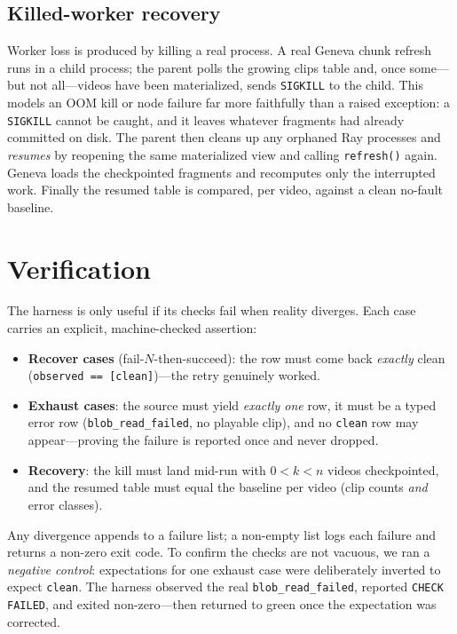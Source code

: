 \documentclass[11pt]{article}
\newcommand{\ct}[1]{\texttt{\small #1}}
\begin{document}
\subsection{Killed-worker recovery}
\label{sec:recovery}

Worker loss is produced by killing a real process. A real Geneva chunk refresh
runs in a child process; the parent polls the growing clips table and, once
some---but not all---videos have been materialized, sends \ct{SIGKILL} to the
child. This models an OOM kill or node failure far more faithfully than a raised
exception: a \ct{SIGKILL} cannot be caught, and it leaves whatever fragments had
already committed on disk. The parent then cleans up any orphaned Ray processes
and \emph{resumes} by reopening the same materialized view and calling
\ct{refresh()} again. Geneva loads the checkpointed fragments and recomputes only
the interrupted work. Finally the resumed table is compared, per video, against a
clean no-fault baseline.

\section{Verification}

The harness is only useful if its checks fail when reality diverges. Each case
carries an explicit, machine-checked assertion:

\begin{itemize}[itemsep=1pt,topsep=2pt]
  \item \textbf{Recover cases} (fail-$N$-then-succeed): the row must come back
  \emph{exactly} clean (\ct{observed == [clean]})---the retry genuinely worked.
  \item \textbf{Exhaust cases}: the source must yield \emph{exactly one} row, it
  must be a typed error row (\ct{blob\_read\_failed}, no playable clip), and no
  \ct{clean} row may appear---proving the failure is reported once and never
  dropped.
  \item \textbf{Recovery}: the kill must land mid-run with $0 < k < n$ videos
  checkpointed, and the resumed table must equal the baseline per video (clip
  counts \emph{and} error classes).
\end{itemize}

Any divergence appends to a failure list; a non-empty list logs each failure and
returns a non-zero exit code. To confirm the checks are not vacuous, we ran a
\emph{negative control}: expectations for one exhaust case were deliberately
inverted to expect \ct{clean}. The harness observed the real
\ct{blob\_read\_failed}, reported \ct{CHECK FAILED}, and exited non-zero---then
returned to green once the expectation was corrected.
\end{document}
